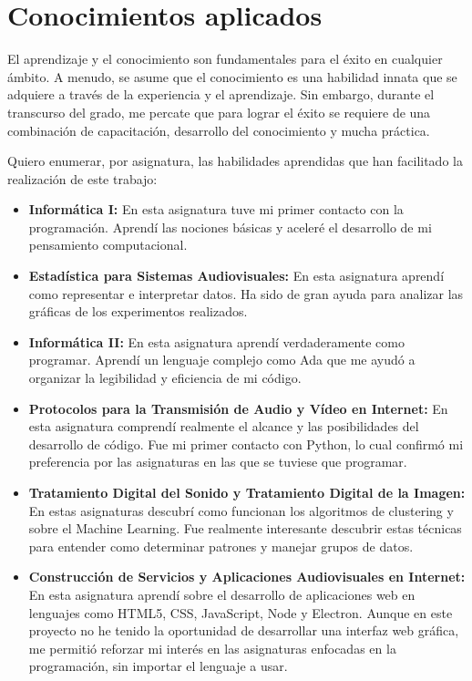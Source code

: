 \documentclass[a4paper, 12pt]{book}
\begin{document}
\section{Conocimientos aplicados}
\label{sec:aplicacion}


El aprendizaje y el conocimiento son fundamentales para el éxito en cualquier ámbito. A menudo, se asume que el conocimiento es una habilidad innata que se adquiere a través de la experiencia y el aprendizaje. Sin embargo, durante el transcurso del grado, me percate que para lograr el éxito se requiere de una combinación de capacitación, desarrollo del conocimiento y mucha práctica.

Quiero enumerar, por asignatura, las habilidades aprendidas que han facilitado la realización de este trabajo:

\begin{itemize}
\item \textbf{Informática I:} En esta asignatura tuve mi primer contacto con la programación. Aprendí las nociones básicas y aceleré el desarrollo de mi pensamiento computacional.
\item \textbf{Estadística para Sistemas Audiovisuales:} En esta asignatura aprendí como representar e interpretar datos. Ha sido de gran ayuda para analizar las gráficas de los experimentos realizados.
\item \textbf{Informática II:} En esta asignatura aprendí verdaderamente como programar. Aprendí un lenguaje complejo como Ada que me ayudó a organizar la legibilidad y eficiencia de mi código. 
\item \textbf{Protocolos para la Transmisión de Audio y Vídeo en Internet:} En esta asignatura comprendí realmente el alcance y las posibilidades del desarrollo de código. Fue mi primer contacto con Python, lo cual confirmó mi preferencia por las asignaturas en las que se tuviese que programar.
\item \textbf{Tratamiento Digital del Sonido y Tratamiento Digital de la Imagen:} En estas asignaturas descubrí como funcionan los algoritmos de clustering y sobre el Machine Learning. Fue realmente interesante descubrir estas técnicas para entender como determinar patrones y manejar grupos de datos.
\item \textbf{Construcción de Servicios y Aplicaciones Audiovisuales en Internet:} En esta asignatura aprendí sobre el desarrollo de aplicaciones web en lenguajes como HTML5, CSS, JavaScript, Node y Electron. Aunque en este proyecto no he tenido la oportunidad de desarrollar una interfaz web gráfica, me permitió reforzar mi interés en las asignaturas enfocadas en la programación, sin importar el lenguaje a usar.
\end{itemize}
\end{document}
